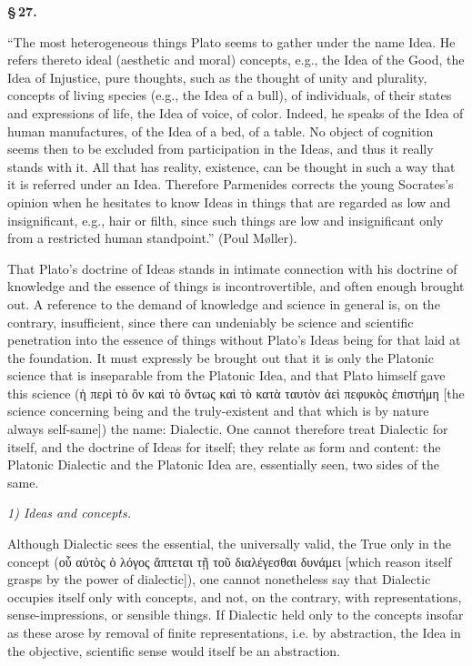 \documentclass[12pt]{book}
\begin{document}
\begin{center}{\bfseries \S\,27.}\end{center}

``The most heterogeneous things Plato seems to gather under the name Idea. He refers thereto ideal
(aesthetic and moral) concepts, e.g., the Idea of the Good, the Idea of Injustice, pure thoughts,
such as the thought of unity and plurality, concepts of living species (e.g., the Idea of a bull), of
individuals, of their states and expressions of life, the Idea of voice, of color. Indeed, he speaks
of the Idea of human manufactures, of the Idea of a bed, of a table. No object of cognition seems
then to be excluded from participation in the Ideas, and thus it really stands with it. All that has
reality, existence, can be thought in such a way that it is referred under an Idea. Therefore
Parmenides corrects the young Socrates's opinion when he hesitates to know Ideas in things that are
regarded as low and insignificant, e.g., hair or filth, since such things are low and insignificant
only from a restricted human standpoint.'' (Poul Møller).

That Plato's doctrine of Ideas stands in intimate connection with his doctrine of knowledge and the
essence of things is incontrovertible, and often enough brought out. A reference to the demand of
knowledge and science in general is, on the contrary, insufficient, since there can undeniably be
science and scientific penetration into the essence of things without Plato's Ideas being for that
laid at the foundation. It must expressly be brought out that it is only the Platonic science that is
inseparable from the Platonic Idea, and that Plato himself gave this science (ἡ περὶ τὸ ὂν καὶ τὸ
ὄντως καὶ τὸ κατὰ ταυτὸν ἀεὶ πεφυκὸς ἐπιστήμη [the science concerning being and the truly-existent
and that which is by nature always self-same]) the name: Dialectic. One cannot therefore treat
Dialectic for itself, and the doctrine of Ideas for itself; they relate as form and content: the
Platonic Dialectic and the Platonic Idea are, essentially seen, two sides of the same.

\emph{1) Ideas and concepts.}

Although Dialectic sees the essential, the universally valid, the True only in the concept (οὗ αὐτὸς
ὁ λόγος ἅπτεται τῇ τοῦ διαλέγεσθαι δυνάμει [which reason itself grasps by the power of dialectic]),
one cannot nonetheless say that Dialectic occupies itself only with concepts, and not, on the
contrary, with representations, sense-impressions, or sensible things. If Dialectic held only to the
concepts insofar as these arose by removal of finite representations, i.e. by abstraction, the Idea
in the objective, scientific sense would itself be an abstraction.
\end{document}
